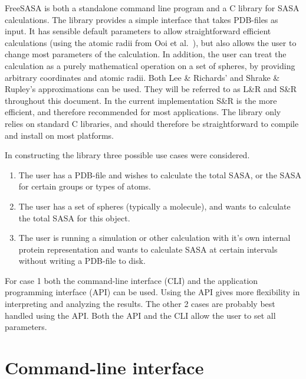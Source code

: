 \documentclass[a4paper,11pt]{article}
\begin{document}
FreeSASA is both a standalone command line program and a C library for
SASA calculations. The library provides a simple interface that takes
PDB-files as input. It has sensible default parameters to allow
straightforward efficient calculations (using the atomic radii from
Ooi et al.~\cite{OONS}), but also allows the user to change most
parameters of the calculation. In addition, the user can treat the
calculation as a purely mathematical operation on a set of spheres, by
providing arbitrary coordinates and atomic radii. Both Lee \&
Richards' \cite{LnR} and Shrake \& Rupley's \cite{SnR} approximations
can be used. They will be referred to as L\&R and S\&R throughout this
document. In the current implementation S\&R is the more efficient,
and therefore recommended for most applications. The library only
relies on standard C libraries, and should therefore be
straightforward to compile and install on most platforms.

In constructing the library three possible use cases were considered. 
\begin{enumerate}
\item The user has a PDB-file and wishes to calculate the total SASA, 
  or the SASA for certain groups or types of atoms.
\item The user has a set of spheres (typically a molecule), and wants
  to calculate the total SASA for this object.
\item The user is running a simulation or other calculation with it's
  own internal protein representation and wants to calculate SASA at
  certain intervals without writing a PDB-file to disk.
\end{enumerate}
For case 1 both the command-line interface (CLI) and the application
programming interface (API) can be used. Using the API gives more
flexibility in interpreting and analyzing the results. The other 2
cases are probably best handled using the API. Both the API and the
CLI allow the user to set all parameters.

\section{Command-line interface}\label{sec:cli}
\end{document}

